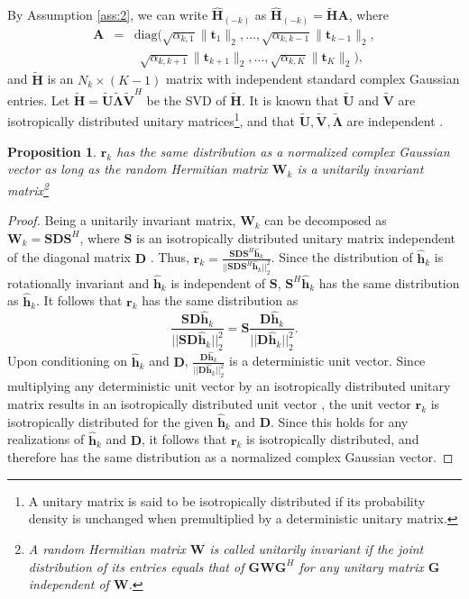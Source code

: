 \documentclass[twocolumn,10pt]{IEEEtran}
\theoremstyle{plain} \newtheorem{theorem}{Theorem}
\theoremstyle{plain} \newtheorem{proposition}{Proposition}
\theoremstyle{plain} \newtheorem{corollary}{Corollary}
\theoremstyle{remark} \newtheorem{remark}{Remark}
\theoremstyle{remark} \newtheorem{lemma}{Lemma}
\theoremstyle{plain} \newtheorem{definition}{Definition}
\theoremstyle{plain} \newtheorem{assumption}{Assumption}
\theoremstyle{plain} \newtheorem{fact}{Fact}
\begin{document}
By Assumption \ref{ass:2}, we can write $\mathbf{\hat{H}}_{(-k)}$ as $\mathbf{\hat{H}}_{(-k)} =\mathbf{\tilde{H}} \mathbf{A}$, where
\begin{eqnarray*}
 \mathbf{A}& =& \mathrm{diag}(\sqrt{\alpha_{k,1}}\|\mathbf{t}_1\|_2, \ldots, \sqrt{\alpha_{k,k-1}}\|\mathbf{t}_{k-1}\|_2, \nonumber\\
&&~~\sqrt{\alpha_{k,k+1}}\|\mathbf{t}_{k+1}\|_2, \ldots, \sqrt{\alpha_{k,K}}\|\mathbf{t}_K\|_2), 
\end{eqnarray*}
and $\mathbf{\tilde{H}}$ is an $N_k\times (K-1)$ matrix with independent standard complex Gaussian entries. Let $\mathbf{\tilde{H}}=\mathbf{\tilde{U}}\mathbf{\tilde{\Lambda}}\mathbf{\tilde{V}}^H$ be the SVD of $\mathbf{\tilde{H}}$. It is known that $\mathbf{\tilde{U}}$ and $\mathbf{\tilde{V}}$ are isotropically distributed unitary matrices\footnote{A unitary matrix is said to be isotropically distributed if its probability density is unchanged when premultiplied by a deterministic unitary matrix.}, and that $\mathbf{\tilde{U}},\mathbf{\tilde{V}},\mathbf{\tilde{\Lambda}}$ are independent \cite{MH99}.

\begin{proposition} \label{pro:1}
$\mathbf{r}_k$ has the same distribution as a normalized complex Gaussian vector as long as the random Hermitian matrix $\mathbf{W}_k$ is a unitarily invariant matrix\footnote{A random Hermitian matrix $\mathbf{W}$ is called unitarily invariant if the joint distribution of its entries equals that of $\mathbf{G}\mathbf{W}\mathbf{G}^H$ for any unitary matrix $\mathbf{G}$ independent of $\mathbf{W}$.}
\end{proposition} 

\begin{proof}
Being a unitarily invariant matrix, $\mathbf{W}_k$ can be decomposed as $\mathbf{W}_k=\mathbf{S}\mathbf{D}\mathbf{S}^H$, where $\mathbf{S}$ is an isotropically distributed unitary matrix independent of the diagonal matrix $\mathbf{D}$ \cite{TV04}. Thus, $\mathbf{r}_k=\frac{\mathbf{S}\mathbf{D}\mathbf{S}^H\hat{\mathbf{h}}_k}{||\mathbf{S}\mathbf{D}\mathbf{S}^H\hat{\mathbf{h}}_k||_2^2}$. Since the distribution of $\hat{\mathbf{h}}_k$ is rotationally invariant and $\hat{\mathbf{h}}_k$ is independent of $\mathbf{S}$, $\mathbf{S}^H\hat{\mathbf{h}}_k$ has the same distribution as $\hat{\mathbf{h}}_k$. It follows that $\mathbf{r}_k$ has the same distribution as
$$\frac{\mathbf{S}\mathbf{D}\hat{\mathbf{h}}_k}{||\mathbf{S}\mathbf{D}\hat{\mathbf{h}}_k||_2^2} = \mathbf{S}\frac{\mathbf{D}\hat{\mathbf{h}}_k}{||\mathbf{D}\hat{\mathbf{h}}_k||_2^2}.$$
Upon conditioning on $\hat{\mathbf{h}}_k$ and $\mathbf{D}$, $\frac{\mathbf{D}\hat{\mathbf{h}}_k}{||\mathbf{D}\hat{\mathbf{h}}_k||_2^2}$ is a deterministic unit vector. Since multiplying any deterministic unit vector by an isotropically distributed unitary matrix results in an isotropically distributed unit vector \cite{TV04}, the unit vector $\mathbf{r}_k$ is isotropically distributed for the given $\hat{\mathbf{h}}_k$ and $\mathbf{D}$. Since this holds for any realizations of $\hat{\mathbf{h}}_k$ and $\mathbf{D}$, it follows that $\mathbf{r}_k$ is isotropically distributed, and therefore has the same distribution as a normalized complex Gaussian vector.
\end{proof}
\end{document}
